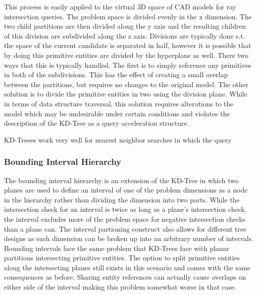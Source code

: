 \documentclass[10pt, a4paper]{article}
\begin{document}
This process is easily applied to the virtual 3D space of CAD models for ray intersection queries. The problem space is divided evenly in the x dimension. The two child partitions are then divided along the y axis and the resulting children of this division are subdivided along the z axis. Divisions are typically done s.t. the space of the current candidate is separated in half, however it is possible that by doing this primitive entities are divided by the hyperplane as well. There two ways that this is typically handled. The first is to simply reference any primitives in both of the subdivisions. This has the effect of creating a small overlap between the partitions, but requires no changes to the original model. The other solution is to divide the primitive entities in two using the division plane. While in terms of data structure traversal, this solution requires alterations to the model which may be undesirable under certain conditions and violates the description of the KD-Tree as a query acceleration structure.

KD-Treees work very well for nearest neighbor searches in which the query




\subsubsection{Bounding Interval Hierarchy}%

The bounding interval hierarchy is an extension of the KD-Tree in which two planes are used to define an interval of one of the problem dimensions as a node in the hierarchy rather than dividing the dimension into two parts. While the intersection check for an interval is twice as long as a plane's intersection check, the interval excludes more of the problem space for negative intersection checks than a plane can. The interval partioning construct also allows for different tree designs as each dimension can be broken up into an arbitrary number of intervals. Bounding intervals face the same problem that KD-Trees face with planar partitions intersecting primitive entities. The option to split primitive entities along the intersecting planes still exists in this scenario and comes with the same consequences as before. Sharing entity references can actually cause overlaps on either side of the interval making this problem somewhat worse in that case.
\end{document}
